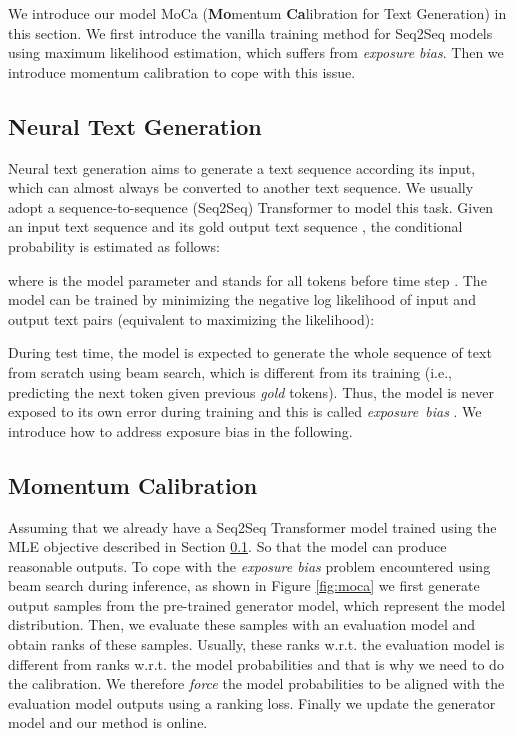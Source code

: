 \documentclass{article}
\begin{document}
We introduce our model MoCa ({\bf Mo}mentum {\bf Ca}libration for Text Generation) in this section. We first introduce the vanilla training method for Seq2Seq models using maximum likelihood estimation, which suffers from \emph{exposure bias}. Then we introduce momentum calibration to cope with  this issue.

\subsection{Neural Text Generation}
\label{sec:generation}
Neural text generation aims to generate a text sequence according its input, which can almost always be converted to another text sequence. We usually adopt a sequence-to-sequence (Seq2Seq) Transformer \cite{Vaswani:2017:NIPS} to model this task. Given an input text sequence  and its gold output text sequence , the conditional probability  is estimated as follows:

where  is the model parameter and  stands for all tokens before time step .
The model can be trained by minimizing the negative log likelihood of input and output text pairs (equivalent to maximizing the likelihood):


During test time, the model is expected to generate the whole sequence of text from scratch using beam search, which is different from its training (i.e., predicting the next token given previous \emph{gold} tokens). Thus, the model is never exposed to its own error during training and this is called 
\mbox{\emph{exposure bias}} \cite{ranzato:2015:arxiv}. We introduce how to address exposure bias in the following.


\subsection{Momentum Calibration}
Assuming that we already have a Seq2Seq Transformer model trained using the MLE objective described in Section \ref{sec:generation}. So that the model can produce reasonable outputs. To cope with the \emph{exposure bias} problem encountered using beam search during inference, as shown in Figure \ref{fig:moca} we first generate output samples from the pre-trained generator model, which represent the model distribution. Then, we evaluate these samples with an evaluation model and obtain ranks of these samples. Usually, these ranks w.r.t. the evaluation model is different from ranks w.r.t. the model probabilities and that is why we need to do the calibration. We therefore \emph{force} the model probabilities to be aligned with the evaluation model outputs using a ranking loss. Finally we update the generator model and our method is online. 
\end{document}
